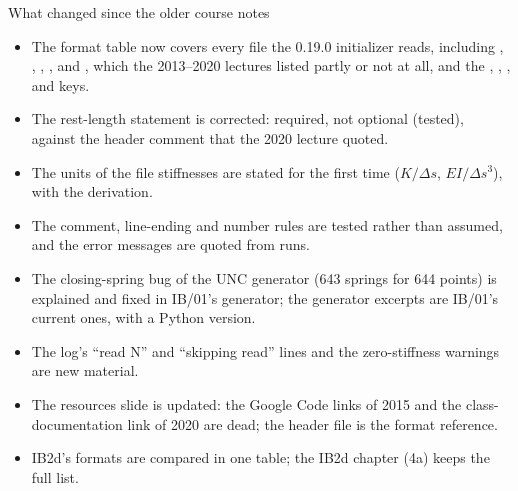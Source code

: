 \documentclass[aspectratio=169,11pt]{beamer}
\begin{document}
\begin{frame}{What changed since the older course notes}
\small
\begin{itemize}
  \item The format table now covers every file the 0.19.0 initializer reads, including , , , ,  and , which the 2013--2020 lectures listed partly or not at all, and the , , ,  and  keys.
  \item The rest-length statement is corrected: required, not optional (tested), against the header comment that the 2020 lecture quoted.
  \item The units of the file stiffnesses are stated for the first time ($K/\Delta s$, $EI/\Delta s^3$), with the derivation.
  \item The comment, line-ending and number rules are tested rather than assumed, and the error messages are quoted from runs.
  \item The closing-spring bug of the UNC generator (643 springs for 644 points) is explained and fixed in IB/01's generator; the generator excerpts are IB/01's current ones, with a Python version.
  \item The log's ``read N'' and ``skipping read'' lines and the zero-stiffness warnings are new material.
  \item The resources slide is updated: the Google Code links of 2015 and the class-documentation link of 2020 are dead; the header file is the format reference.
  \item IB2d's formats are compared in one table; the IB2d chapter (4a) keeps the full list.
\end{itemize}
\end{frame}
\end{document}
